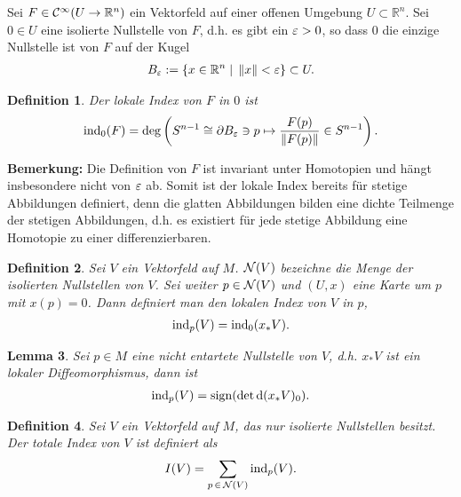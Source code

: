 \documentclass[12pt,a4paper]{article}
\def\R{\mathbb{R}}
\def\sign{\mathrm{sign}}
\newtheorem{Lemma}{Lemma}[section]
\newtheorem{Definition}[Lemma]{Definition}
\begin{document}
Sei $F\in\CC^\infty(U\to\R^n)$ ein Vektorfeld auf einer offenen Umgebung
$U\subset\R^n$. Sei $0\in U$ eine isolierte Nullstelle von $F$, d.h. es gibt ein
$\varepsilon > 0$, so dass $0$ die einzige Nullstelle ist von $F$ auf der Kugel
\begin{align*}
B_\ep := \setdef{x\in\R^n}{\norm{x}<\ep}\subset U.
\end{align*}

\begin{Definition}
Der \emph{lokale Index} von $F$ in $0$ ist
\begin{align*}
\mathrm{ind}_0(F) = \deg\left(S^{n-1}\cong\partial B_\varepsilon\ni p \mapsto
\frac{F(p)}{\left\|F(p)\right\|}\in S^{n-1} \right).
\end{align*}
\end{Definition}

\bigskip

{\bf Bemerkung:}
Die Definition von $F$ ist invariant unter Homotopien und h\"angt insbesondere
nicht von $\varepsilon$ ab. Somit ist der lokale Index bereits f\"ur stetige Abbildungen
definiert, denn die glatten Abbildungen bilden eine dichte Teilmenge der
stetigen Abbildungen, d.h. es existiert f\"ur jede stetige Abbildung eine
Homotopie zu einer differenzierbaren.

\bigskip

\begin{Definition}
Sei $V$ ein Vektorfeld auf $M$. $\mathcal{N}(V)$ bezeichne die \emph{Menge der
isolierten Nullstellen} von $V$. Sei weiter $p\in \mathcal{N}(V)$ und $(U,x)$ eine
Karte um $p$ mit $x(p) = 0$. Dann definiert man den \emph{lokalen Index} von
$V$ in $p$,
\begin{align*}
\mathrm{ind}_p(V) = \mathrm{ind}_0(x_*V).
\end{align*}
\end{Definition}

\bigskip

\begin{Lemma}
Sei $p\in M$ eine nicht entartete Nullstelle von $V$, d.h. $x_* V$ ist ein
lokaler Diffeomorphismus, dann ist
\begin{align*}
\ind_p(V) = \sign(\det \diffd(x_*V)_0).
\end{align*}
\end{Lemma}

\bigskip

\begin{Definition}
Sei $V$ ein Vektorfeld auf $M$, das nur isolierte Nullstellen besitzt.
Der \emph{totale Index} von $V$ ist definiert als
\begin{align*}
I(V) = \sum_{p\,\in\,\mathcal{N}(V)}\mathrm{ind}_p(V).
\end{align*}
\end{Definition}
\end{document}
